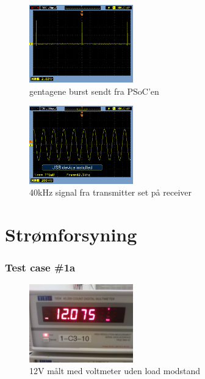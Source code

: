 \begin{figure}[hbpt]
\centering
\includegraphics[width = 0.4\textwidth]{billeder/gentageneburst}
\caption{gentagene burst sendt fra PSoC'en}
\label{fig:burstpsoc}
\end{figure}
\begin{figure}[hbpt]
\centering
\includegraphics[width = 0.4\textwidth]{billeder/transmittertest}
\caption{40kHz signal fra transmitter set på receiver}
\label{fig:transmittertest}
\end{figure}
\newpage
\section{Strømforsyning}
\subsubsection{Test case \#1a}
\begin{figure}[hbpt]
\centering
\includegraphics[width = 0.4\textwidth]{billeder/12V_0A}
\caption{12V målt med voltmeter uden load modstand}
\label{fig:udgang_12V_0A}
\end{figure}
